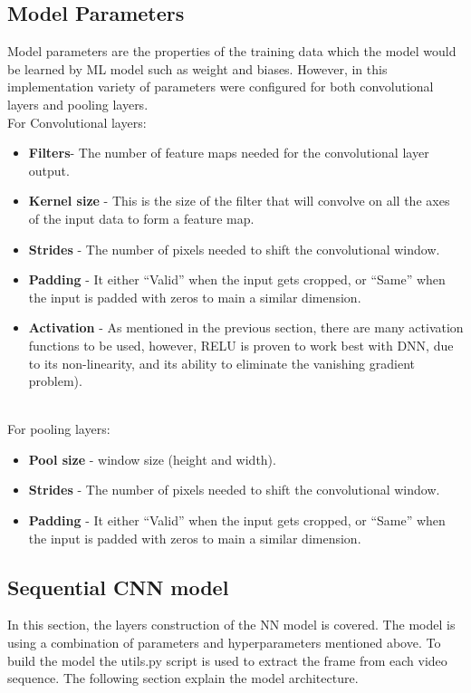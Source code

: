\subsection{Model Parameters}
\hspace{5mm} Model parameters are the properties of the training data which the model would be learned by ML model such as weight and biases. However, in this implementation variety of parameters were configured for both convolutional layers and pooling layers.\\

For Convolutional layers:
\begin{itemize}
\item \textbf{Filters}- The number of feature maps needed for the convolutional layer output.
\item \textbf{Kernel size} - This is the size of the filter that will convolve on all the axes of the input data to form a feature map.
\item \textbf{Strides} - The number of pixels needed to shift the convolutional window.
\item \textbf{Padding} - It either “Valid” when the input gets cropped, or “Same” when the input is padded with zeros to main a similar dimension.
\item \textbf{Activation }- As mentioned in the previous section, there are many activation functions to be used, however, RELU is proven to work best with DNN, due to its non-linearity, and its ability to eliminate the vanishing gradient problem).
\end{itemize}\\

For pooling layers:
\begin{itemize}
\item \textbf{Pool size} - window size (height and width).
\item \textbf{Strides} - The number of pixels needed to shift the convolutional window.
\item \textbf{Padding} - It either “Valid” when the input gets cropped, or “Same” when the input is padded with zeros to main a similar dimension.
\end{itemize}

\subsection{Sequential CNN model}
\hspace{5mm} In this section, the layers construction of the NN model is covered. The model is using a combination of parameters and hyperparameters mentioned above. To build the model the utils.py script is used to extract the frame from each video sequence. The following section explain the model architecture.\\

